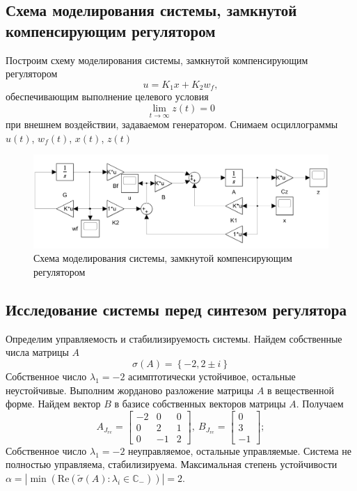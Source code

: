 \documentclass[a4paper, 12pt]{article}
\begin{document}
    \subsection{Схема моделирования системы, замкнутой компенсирующим регулятором}
    Построим схему моделирования системы, замкнутой компенсирующим регулятором
    $$u=K_1x+K_2 w_f,$$ обеспечивающим выполнение целевого условия $$\lim\limits_{t\to\infty}z(t)=0$$
    при внешнем воздействии, задаваемом генератором. Снимаем осциллограммы $u(t)$, $w_f(t)$, $x(t)$, $z(t)$
    \begin{figure}[H]
        \centering
        \includegraphics[scale=0.225]{1task_scheme.png}
        \captionsetup{skip=0pt}
        \caption{Схема моделирования системы, замкнутой компенсирующим регулятором}
        \label{fig:1task_scheme}
    \end{figure}


    \subsection{Исследование системы перед синтезом регулятора}
    Определим управляемость и стабилизируемость системы.
    Найдем собственные числа матрицы $A$
    $$
    \sigma\left( A \right)=\left\{ -2,2\pm i \right\}
    $$
    Собственное число $\lambda_1=-2$ асимптотически устойчивое, остальные неустойчивые.
    Выполним жорданово разложение матрицы $A$ в вещественной форме. Найдем вектор
    $B$ в базисе собственных векторов матрицы $A$. Получаем
    $$
    A_{J_{re}}=\begin{bmatrix}
    -2     &0     &0\\
    0     &2     &1\\
    0    &-1     &2
    \end{bmatrix},\ B_{J_{re}}=\begin{bmatrix}
    0\\
     3\\
    -1
    \end{bmatrix};
    $$
    Собственное число $\lambda_1=-2$ неуправляемое, остальные управляемые. Система не полностью управляема,
    стабилизируема. Максимальная степень устойчивости
    $\alpha=|\min{\left(\text{Re}\left( \tilde{\sigma}\left( A \right):\lambda_i\in\mathbb{C}_{-} \right)\right)}|=2$.
\end{document}
